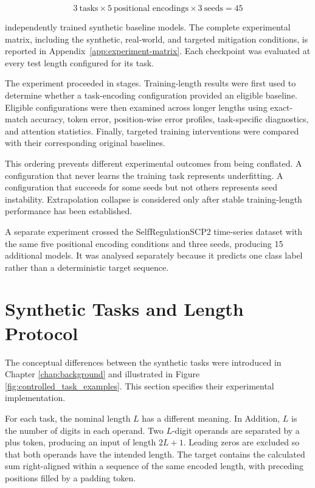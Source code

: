 \documentclass[
    author={Aanchala Ravindra Bhongade},
    supervisor={Dr. Fernando Moreno-Pino},
    degree={MSc},
    title={Length Generalisation in Transformer-Based Sequence Models: Failure Taxonomy and Mitigation Strategies},
    subtitle={},
    type={},
    year={2026}
]{dissertation}
\begin{document}
\[
3\ \text{tasks}
\times
5\ \text{positional encodings}
\times
3\ \text{seeds}
=
45
\]

independently trained synthetic baseline models. The complete experimental matrix, including the synthetic, real-world, and
targeted mitigation conditions, is reported in
Appendix~\ref{app:experiment-matrix}. Each checkpoint was evaluated at every test length configured for its task.



The experiment proceeded in stages. Training-length results were first used to determine whether a task-encoding configuration provided an eligible baseline. Eligible configurations were then examined across longer lengths using exact-match accuracy, token error, position-wise error profiles, task-specific diagnostics, and attention statistics. Finally, targeted training interventions were compared with their corresponding original baselines.

This ordering prevents different experimental outcomes from being conflated. A configuration that never learns the training task represents underfitting. A configuration that succeeds for some seeds but not others represents seed instability. Extrapolation collapse is considered only after stable training-length performance has been established.

A separate experiment crossed the SelfRegulationSCP2 time-series dataset with the same five positional encoding conditions and three seeds, producing 15 additional models. It was analysed separately because it predicts one class label rather than a deterministic target sequence.

\section{Synthetic Tasks and Length Protocol}
\label{sec:method-synthetic-tasks}

The conceptual differences between the synthetic tasks were introduced in Chapter \ref{chap:background} and illustrated in
Figure \ref{fig:controlled_task_examples}. This section specifies their experimental implementation.

For each task, the nominal length \(L\) has a different meaning. In Addition, \(L\) is the number of digits in each operand. Two \(L\)-digit operands are separated by a plus token, producing an input of length \(2L+1\). Leading zeros are excluded so that both operands have the intended length. The target contains the calculated sum right-aligned within a sequence of the same encoded length, with preceding positions filled by a padding token.
\end{document}
